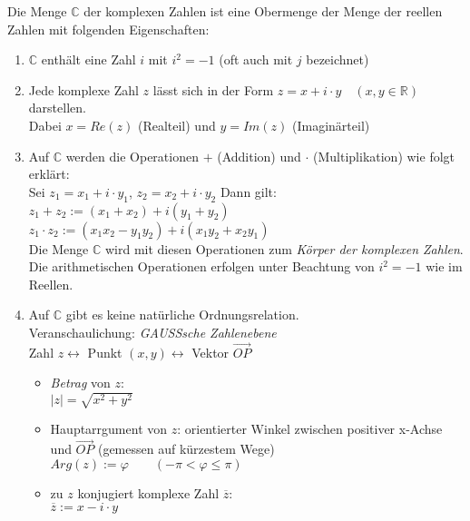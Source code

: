 Die Menge $\mathbb{C}$ der komplexen Zahlen ist eine Obermenge der Menge der reellen Zahlen mit folgenden Eigenschaften:
\begin{enumerate}
\item $\mathbb{C}$ enthält eine Zahl $i$ mit $\boxed{i^2=-1}$ (oft auch mit $j$ bezeichnet)
\item Jede komplexe Zahl $z$ lässt sich in der Form $\boxed{z=x+i\cdot y} \quad (x,y \in \mathbb{R})$ darstellen.\\
Dabei $x=Re(z)$ (Realteil) und $y=Im(z)$ (Imaginärteil)
\item Auf $\mathbb{C}$ werden die Operationen $+$ (Addition) und $\cdot$ (Multiplikation) wie folgt erklärt: \\
Sei $z_1=x_1+i\cdot y_1$, $z_2=x_2+i\cdot y_2$ Dann gilt: \\
$z_1+z_2:= (x_1+x_2)+ i (y_1+y_2)$\\
$z_1\cdot z_2 := (x_1 x_2-y_1 y_2)+i (x_1 y_2 + x_2 y_1)$\\
Die Menge $\mathbb{C}$ wird mit diesen Operationen zum \emph{Körper der komplexen Zahlen}. Die arithmetischen Operationen erfolgen unter Beachtung von $i^2=-1$ wie im Reellen.
\item Auf $\mathbb{C}$ gibt es keine natürliche Ordnungsrelation.\\
Veranschaulichung: \emph{GAUSSsche Zahlenebene}\\
Zahl $z \leftrightarrow$ Punkt $(x,y) \leftrightarrow$ Vektor $\overrightarrow{OP}$\\
\begin{itemize}
\item \emph{Betrag} von $z$: \\
$|z|=\sqrt{x^2+y^2}$
\item Hauptarrgument von $z$: orientierter Winkel zwischen positiver x-Achse und $\overrightarrow{OP}$ (gemessen auf kürzestem Wege)\\
$Arg(z):= \varphi \qquad (-\pi < \varphi \leq \pi )$
\item zu $z$ konjugiert komplexe Zahl $\overline{z}:$\\
$\overline{z} := x - i \cdot y$
\end{itemize}
\end{enumerate}

